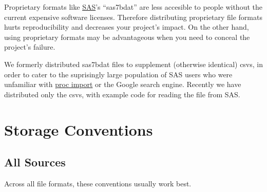 \documentclass[
]{book}
\begin{document}
Proprietary formats like \href{https://en.wikipedia.org/wiki/SAS_(software)}{SAS}'s ``sas7bdat'' are less accesible to people without the current expensive software licenses. Therefore distributing proprietary file formats hurts reproducibility and decreases your project's impact. On the other hand, using proprietary formats may be advantageous when you need to conceal the project's failure.

We formerly distributed sas7bdat files to supplement (otherwise identical) csvs, in order to cater to the suprisingly large population of SAS users who were unfamiliar with \href{https://documentation.sas.com/?docsetId=proc\&docsetTarget=n18jyszn33umngn14czw2qfw7thc.htm\&docsetVersion=9.4\&locale=en}{proc import} or the Google search engine. Recently we have distributed only the csvs, with example code for reading the file from SAS.

\hypertarget{data-conventions}{%
\section{Storage Conventions}\label{data-conventions}}

\hypertarget{data-conventions-all}{%
\subsection{All Sources}\label{data-conventions-all}}

Across all file formats, these conventions usually work best.
\end{document}
